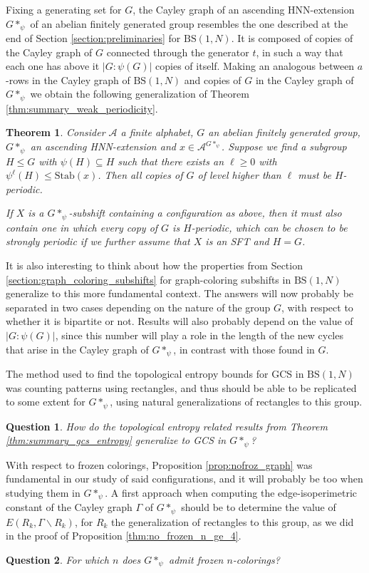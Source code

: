 \documentclass[letterpaper,10pt]{amsart}
\theoremstyle{plain}
\newtheorem{theorem}{Theorem}[section]
\newtheorem*{question*}{Question}
\newcommand{\BS}[1][N]{\mathrm{BS}(1,#1)}
\begin{document}
		Fixing a generating set for $G$, the Cayley graph of an ascending HNN-extension $G*_{\psi}$ of an abelian finitely generated group resembles the one described at the end of Section \ref{section:preliminaries} for $\BS$. It is composed of copies of the Cayley graph of $G$ connected through the generator $t$, in such a way that each one has above it $|G:\psi(G)|$ copies of itself. Making an analogous between $a$-rows in the Cayley graph of $\BS$ and copies of $G$ in the Cayley graph of $G*_{\psi}$ we obtain the following generalization of Theorem \ref{thm:summary_weak_periodicity}.
	
	\begin{theorem}
		Consider $\mathcal{A}$ a finite alphabet, $G$ an abelian finitely generated group, $G*_{\psi}$ an ascending HNN-extension and $x\in \mathcal{A}^{G*_{\psi}}$. Suppose we find a subgroup $H\le G$ with $\psi(H)\subseteq H$ such that there exists an $\ell\ge 0$ with $\psi^\ell(H)\le \mathrm{Stab}(x)$. Then all copies of $G$ of level higher than $\ell$ must be $H$-periodic.
		
		If $X$ is a $G*_{\psi}$-subshift containing a configuration as above, then it must also contain one in which every copy of $G$ is $H$-periodic, which can be chosen to be strongly periodic if we further assume that $X$ is an SFT and $H=G$. 
	\end{theorem}

	
It is also interesting to think about how the properties from Section \ref{section:graph_coloring_subshifts} for graph-coloring subshifts in $\BS$ generalize to this more fundamental context. The answers will now probably be separated in two cases depending on the nature of the group $G$, with respect to whether it is bipartite or not. Results will also probably depend on the value of $|G:\psi(G)|$, since this number will play a role in the length of the new cycles that arise in the Cayley graph of $G*_{\psi}$, in contrast with those found in $G$.

The method used to find the topological entropy bounds for GCS in $\BS$ was counting patterns using rectangles, and thus should be able to be replicated to some extent for $G*_{\psi}$, using natural generalizations of rectangles to this group. 
	\begin{question*}
How do the topological entropy related results from Theorem \ref{thm:summary_gcs_entropy} generalize to GCS in $G*_{\psi}$?
\end{question*}
With respect to frozen colorings, Proposition \ref{prop:nofroz_graph} was fundamental in our study of said configurations, and it will probably be too when studying them in $G*_{\psi}$. A first approach when computing the edge-isoperimetric constant of the Cayley graph $\Gamma$ of $G*_{\psi}$ should be to determine the value of $E(R_k,\Gamma\backslash R_k)$, for $R_k$ the generalization of rectangles to this group, as we did in the proof of Proposition \ref{thm:no_frozen_n_ge_4}.
\begin{question*}
	For which $n$ does $G*_{\psi}$ admit frozen $n$-colorings?
\end{question*}
	
\end{document}
